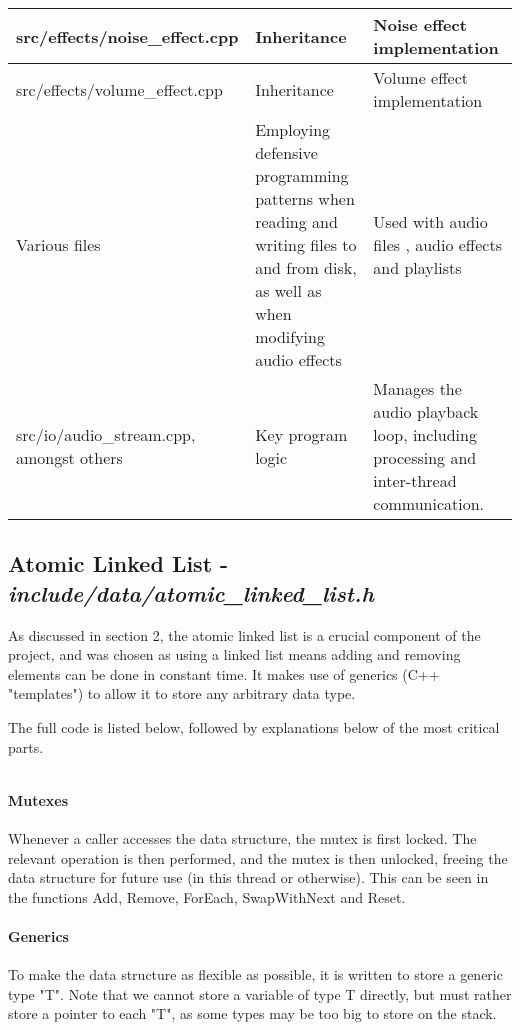{\begin{table}[h!]
\begin{center}
\begin{tabularx}{1.0 \textwidth} {
					| >{\raggedright\arraybackslash}X 
					| >{\raggedright\arraybackslash}X
					| >{\raggedright\arraybackslash}X 
					|
				}
				\hline
				src/effects/noise\_effect.cpp & Inheritance & Noise effect implementation \\
				
				\hline
				src/effects/volume\_effect.cpp & Inheritance & Volume effect implementation \\
				
				\hline
				Various files & Employing defensive programming patterns when reading and writing files to and from disk, as well as when modifying audio effects & Used with audio files , audio effects and playlists \\
				
				\hline
				src/io/audio\_stream.cpp, amongst others & Key program logic & Manages the audio playback loop, including processing and inter-thread communication. \\
				
				\hline
			\end{tabularx}
		\end{center}
	\end{table}
}

\pagebreak
\subsection{Atomic Linked List - \textit{include/data/atomic\_linked\_list.h}}
As discussed in section 2, the atomic linked list is a crucial component of the project, and was chosen as using a linked list means adding and removing elements can be done in constant time.  It makes use of generics (C++ "templates") to allow it to store any arbitrary data type. 

The full code is listed below, followed by explanations below of the most critical parts.

\inputminted[linenos]{c++}{../include/data/atomic_linked_list.h}

\paragraph{Mutexes} Whenever a caller accesses the data structure, the mutex is first locked. The relevant operation is then performed, and the mutex is then unlocked, freeing the data structure for future use (in this thread or otherwise). This can be seen in the functions Add, Remove, ForEach, SwapWithNext and Reset.

\paragraph{Generics} To make the data structure as flexible as possible, it is written to store a generic type "T". Note that we cannot store a variable of type T directly, but must rather store a pointer to each "T", as some types may be too big to store on the stack.

